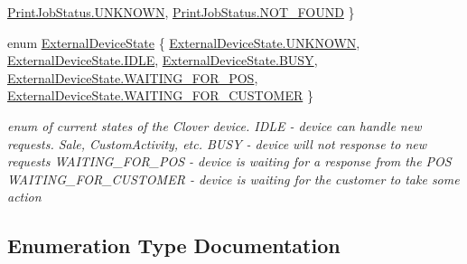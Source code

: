 \begin{DoxyCompactItemize}
\newline
\hyperlink{namespacecom_1_1clover_1_1remotepay_1_1sdk_a7f035b9087c646b0eebf6280d429f7afa696b031073e74bf2cb98e5ef201d4aa3}{Print\+Job\+Status.\+U\+N\+K\+N\+O\+WN}, 
\hyperlink{namespacecom_1_1clover_1_1remotepay_1_1sdk_a7f035b9087c646b0eebf6280d429f7afa8c02547a8a3b02382bac3557bcb2280d}{Print\+Job\+Status.\+N\+O\+T\+\_\+\+F\+O\+U\+ND}
 \}
\item 
enum \hyperlink{namespacecom_1_1clover_1_1remotepay_1_1sdk_a9d5838a91e2711306ad561d104fed034}{External\+Device\+State} \{ \newline
\hyperlink{namespacecom_1_1clover_1_1remotepay_1_1sdk_a9d5838a91e2711306ad561d104fed034a696b031073e74bf2cb98e5ef201d4aa3}{External\+Device\+State.\+U\+N\+K\+N\+O\+WN}, 
\hyperlink{namespacecom_1_1clover_1_1remotepay_1_1sdk_a9d5838a91e2711306ad561d104fed034aa5daf7f2ebbba4975d61dab1c40188c7}{External\+Device\+State.\+I\+D\+LE}, 
\hyperlink{namespacecom_1_1clover_1_1remotepay_1_1sdk_a9d5838a91e2711306ad561d104fed034a802706a9238e2928077f97736854bad4}{External\+Device\+State.\+B\+U\+SY}, 
\hyperlink{namespacecom_1_1clover_1_1remotepay_1_1sdk_a9d5838a91e2711306ad561d104fed034af65801313de012106fc2ab541d03598a}{External\+Device\+State.\+W\+A\+I\+T\+I\+N\+G\+\_\+\+F\+O\+R\+\_\+\+P\+OS}, 
\newline
\hyperlink{namespacecom_1_1clover_1_1remotepay_1_1sdk_a9d5838a91e2711306ad561d104fed034a2735145cbf7e8a1d6c7ff4305140d4a1}{External\+Device\+State.\+W\+A\+I\+T\+I\+N\+G\+\_\+\+F\+O\+R\+\_\+\+C\+U\+S\+T\+O\+M\+ER}
 \}\begin{DoxyCompactList}\small\item\em enum of current states of the Clover device. I\+D\+LE -\/ device can handle new requests. Sale, Custom\+Activity, etc. B\+U\+SY -\/ device will not response to new requests W\+A\+I\+T\+I\+N\+G\+\_\+\+F\+O\+R\+\_\+\+P\+OS -\/ device is waiting for a response from the P\+OS W\+A\+I\+T\+I\+N\+G\+\_\+\+F\+O\+R\+\_\+\+C\+U\+S\+T\+O\+M\+ER -\/ device is waiting for the customer to take some action \end{DoxyCompactList}
\end{DoxyCompactItemize}


\subsection{Enumeration Type Documentation}
\mbox{\label{namespacecom_1_1clover_1_1remotepay_1_1sdk_a9d5838a91e2711306ad561d104fed034}} 
